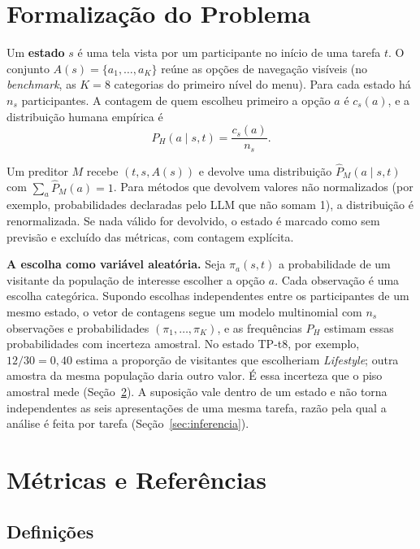\documentclass[12pt,oneside,a4paper,chapter=TITLE,english,brazil]{abntex2}
\newcommand{\Ph}{P_H}
\newcommand{\Pp}{\hat{P}}
\begin{document}
\section{Formalização do Problema}
\label{sec:formal}

Um \textbf{estado} $s$ é uma tela vista por um participante no início de uma tarefa $t$. O conjunto $A(s)=\{a_1,\dots,a_K\}$ reúne as opções de navegação visíveis (no \textit{benchmark}, as $K=8$ categorias do primeiro nível do menu). Para cada estado há $n_s$ participantes. A contagem de quem escolheu primeiro a opção $a$ é $c_s(a)$, e a distribuição humana empírica é
\begin{equation}
\Ph(a \mid s,t) = \frac{c_s(a)}{n_s}.
\end{equation}

Um preditor $M$ recebe $(t, s, A(s))$ e devolve uma distribuição $\Pp_M(a \mid s,t)$ com $\sum_a \Pp_M(a)=1$. Para métodos que devolvem valores não normalizados (por exemplo, probabilidades declaradas pelo LLM que não somam 1), a distribuição é renormalizada. Se nada válido for devolvido, o estado é marcado como sem previsão e excluído das métricas, com contagem explícita.

\textbf{A escolha como variável aleatória.} Seja $\pi_a(s,t)$ a probabilidade de um visitante da população de interesse escolher a opção $a$. Cada observação é uma escolha categórica. Supondo escolhas independentes entre os participantes de um mesmo estado, o vetor de contagens segue um modelo multinomial com $n_s$ observações e probabilidades $(\pi_1,\ldots,\pi_K)$, e as frequências $\Ph$ estimam essas probabilidades com incerteza amostral. No estado TP-t8, por exemplo, $12/30=0{,}40$ estima a proporção de visitantes que escolheriam \textit{Lifestyle}; outra amostra da mesma população daria outro valor. É essa incerteza que o piso amostral mede (Seção~\ref{sec:metricas}). A suposição vale dentro de um estado e não torna independentes as seis apresentações de uma mesma tarefa, razão pela qual a análise é feita por tarefa (Seção~\ref{sec:inferencia}).

\section{Métricas e Referências}
\label{sec:metricas}

\subsection{Definições}
\end{document}
